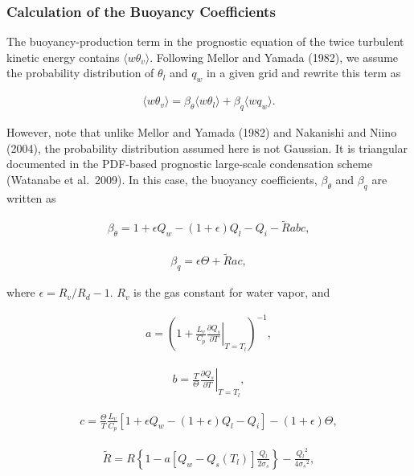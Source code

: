 \hypertarget{calculation-of-the-buoyancy-coefficients}{%
\subsubsection{Calculation of the Buoyancy Coefficients}\label{calculation-of-the-buoyancy-coefficients}}

The buoyancy-production term in the prognostic equation of the twice turbulent kinetic energy contains \(\langle w\theta_v \rangle\). Following Mellor and Yamada (1982), we assume the probability
distribution of \(\theta_l\) and \(q_w\) in a given grid and rewrite this term as

\begin{eqnarray}\langle w\theta_v \rangle=\beta_\theta \langle w\theta_l \rangle + \beta_q \langle wq_w \rangle.\end{eqnarray}

However, note that unlike Mellor and Yamada (1982) and Nakanishi and Niino (2004), the probability distribution assumed here is not Gaussian. It is triangular documented in the PDF-based prognostic
large-scale condensation scheme (Watanabe et al.~2009). In this case, the buoyancy coefficients, \(\beta_\theta\) and \(\beta_q\) are written as

\begin{eqnarray}\beta_\theta=1+\epsilon Q_w-(1+\epsilon)Q_l-Q_i-\tilde{R}abc,\end{eqnarray}

\begin{eqnarray}\beta_q=\epsilon \Theta +\tilde{R}ac,\end{eqnarray}

where \(\epsilon=R_v/R_d-1\). \(R_v\) is the gas constant for water vapor, and

\begin{eqnarray}a=\left(1+\frac{L_v}{C_p}\left.\frac{\partial Q_s}{\partial T}\right|_{T=T_l}\right)^{-1},\end{eqnarray}

\begin{eqnarray}b=\frac{T}{\Theta}\left.\frac{\partial Q_s}{\partial T}\right|_{T=T_l},\end{eqnarray}

\begin{eqnarray}c=\frac{\Theta}{T}\frac{L_v}{C_p}\left[1+\epsilon Q_w-(1+\epsilon)Q_l-Q_i\right]-(1+\epsilon)\Theta,\end{eqnarray}

\begin{eqnarray}\tilde{R}=R\left\{1-a\left[Q_w-Q_s(T_l)\right]\frac{Q_l}{2\sigma_s}\right\}-\frac{{Q_l}^2}{4{\sigma_s}^2},\end{eqnarray}

